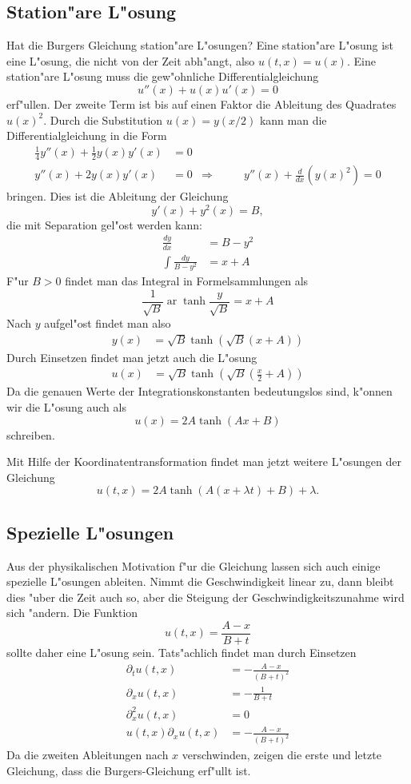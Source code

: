 \subsection{Station"are L"osung}
Hat die Burgers Gleichung station"are L"osungen? Eine station"are L"osung ist
eine L"osung, die nicht von der Zeit abh"angt, also
$u(t,x)=u(x)$.
Eine station"are L"osung muss die gew"ohnliche
Differentialgleichung
\[
u''(x)+u(x)u'(x)=0
\]
erf"ullen. Der zweite Term ist bis auf einen Faktor die Ableitung
des Quadrates $u(x)^2$. Durch die Substitution $u(x)=y(x/2)$ kann man
die Differentialgleichung in die Form
\begin{align*}
\frac14y''(x)+\frac12y(x)y'(x)&=0
\\
y''(x)+2y(x)y'(x)&=0&\Rightarrow&\qquad y''(x)+\frac{d}{dx}(y(x)^2)=0
\end{align*}
bringen.
Dies ist die Ableitung der Gleichung
\[
y'(x)+y^2(x)=B,
\]
die mit Separation gel"ost werden kann:
\begin{align*}
\frac{dy}{dx}&=B-y^2\\
\int\frac{dy}{B-y^2}&=x+A
\end{align*}
F"ur $B>0$  findet man das Integral in Formelsammlungen als
\[
\frac1{\sqrt{B}}\operatorname{ar}\tanh \frac{y}{\sqrt{B}}=x+A
\]
Nach $y$ aufgel"ost findet man also
\begin{align*}
y(x)&=\sqrt{B}\tanh(\sqrt{B}(x+A))
\end{align*}
Durch Einsetzen findet man jetzt auch die L"osung
\begin{align*}
u(x)&=
\sqrt{B}\tanh\left(\sqrt{B}\left(\frac{x}2+A\right)\right)
\end{align*}
Da die genauen Werte der Integrationskonstanten bedeutungslos sind, k"onnen
wir die L"osung auch als
\[
u(x)= 2A \tanh (Ax+B) 
\]
schreiben.

Mit Hilfe der Koordinatentransformation findet man jetzt weitere L"osungen
der Gleichung
\[
u(t,x)=
2A \tanh (A(x+\lambda t)+B) +\lambda.
\]

\subsection{Spezielle L"osungen}
Aus der physikalischen Motivation f"ur die Gleichung lassen sich auch
einige spezielle L"osungen ableiten.
Nimmt die Geschwindigkeit linear zu, dann bleibt dies "uber die Zeit auch
so, aber die Steigung der Geschwindigkeitszunahme wird sich "andern.
Die Funktion
\[
u(t,x)=\frac{A-x}{B+t}
\]
sollte daher
eine L"osung sein. Tats"achlich findet man durch Einsetzen
\begin{align*}
\partial_t u(t,x)&=-\frac{A-x}{(B+t)^2}
\\
\partial_x u(t,x)&=-\frac{1}{B+t}
\\
\partial_x^2 u(t,x)&=0
\\
u(t,x)
\partial_xu(t,x)&=-\frac{A-x}{(B+t)^2}
\end{align*}
Da die zweiten Ableitungen nach $x$ verschwinden,
zeigen die erste und letzte Gleichung, dass die Burgers-Gleichung
erf"ullt ist.

